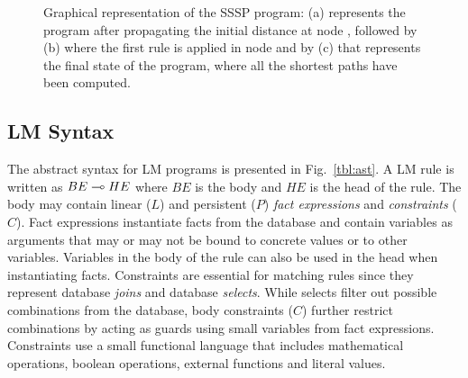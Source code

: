 \begin{figure}[ht]
\begin{center}
  \hspace{0.5cm}
  \hspace{0.01cm}
\end{center}
\caption{Graphical representation of the SSSP program: (a) represents the
   program after propagating the initial distance at node , followed by
   (b) where the first rule is applied in node  and by (c) that
   represents the final state of the program, where all the shortest paths
   have been computed.}
\label{fig:shortest_path_program}
\end{figure}


\subsection{LM Syntax}

The abstract syntax for LM programs is presented in Fig.~\ref{tbl:ast}.  A LM
rule is written as $BE \multimap HE$ where $BE$ is the body and $HE$ is the head of
the rule. The body may contain linear ($L$) and persistent ($P$) \emph{fact
   expressions} and \emph{constraints} ($C$). Fact expressions instantiate facts
from the database and contain variables as arguments that may or may not be
bound to concrete values or to other variables.  Variables in the body of the
rule can also be used in the head when instantiating facts.  Constraints are
essential for matching rules since they represent database \emph{joins} and
database \emph{selects}.  While selects filter out possible combinations from
the database, body constraints ($C$) further restrict combinations by acting as
guards using small variables from fact expressions.  Constraints use a small
functional language that includes mathematical operations, boolean operations,
external functions and literal values.

